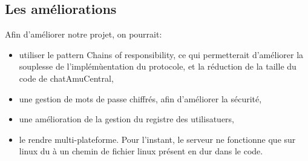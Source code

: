 \subsection{Les améliorations}
Afin d'améliorer notre projet, on pourrait:
\begin{itemize}
	\item utiliser le pattern Chains of responsibility, ce qui permetterait d'améliorer la souplesse de l'implémùentation du protocole, et la réduction de la taille du code de chatAmuCentral,
	\item une gestion de mots de passe chiffrés, afin d'améliorer la sécurité,
	\item une amélioration de la gestion du registre des utilisatuers,
	\item le rendre multi-plateforme. Pour l'instant, le serveur ne fonctionne que sur linux du à un chemin de fichier linux présent en dur dans le code.
\end{itemize}

